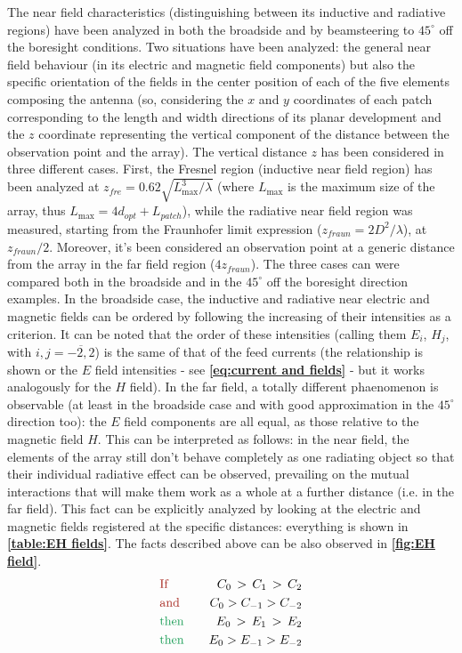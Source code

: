 \documentclass[10 pt,a4paper,twocolumn]{article}
\begin{document}
{The near field characteristics (distinguishing between its inductive and radiative regions) have been analyzed in both the broadside and by beamsteering to $45^\circ$ off the boresight conditions. Two situations have been analyzed: the general near field behaviour (in its electric and magnetic field components) but also the specific orientation of the fields in the center position of each of the five elements composing the antenna (so, considering the $x$ and $y$ coordinates of each patch corresponding to the length and width directions of its planar development and the $z$ coordinate representing the vertical component of the distance between the observation point and the array). The vertical distance $z$ has been considered in three different cases. First, the Fresnel region (inductive near field region) has been analyzed at {\small$z_{fre}=0.62\sqrt{L_{\max}^3/\lambda}$ (where $L_{\max}$} is the maximum size of the array, thus $L_{\max}=4d_{opt}+L_{patch}$), while the radiative near field region was measured, starting from the Fraunhofer limit expression ($z_{fraun}=2D^2/\lambda$), at $z_{fraun}/2$. Moreover, it's been considered an observation point at a generic distance from the array in the far field region ($4z_{fraun}$). The three cases can were compared both in the broadside and in the $45^\circ$ off the boresight direction examples. In the broadside case, the inductive and radiative near electric and magnetic fields can be ordered by following the increasing of their intensities as a criterion. It can be noted that the order of these intensities (calling them $E_i$, $H_j$, with {\small$i,j=\overline{-2,2}$}) is the same of that of the feed currents (the relationship is shown or the $E$ field intensities - see \textbf{\cref{eq:current and fields}} - but it works analogously for the $H$ field). In the far field, a totally different phaenomenon is observable (at least in the broadside case and with good approximation in the $45^\circ$ direction too): the $E$ field components are all equal, as those relative to the magnetic field $H$. This can be interpreted as follows: in the near field, the elements of the array still don't behave completely as one radiating object so that their individual radiative effect can be observed, prevailing on the mutual interactions that will make them work as a whole at a further distance (i.e. in the far field). This fact can be explicitly analyzed by looking at the electric and magnetic fields registered at the specific distances: everything is shown in \textbf{\cref{table:EH fields}}. The facts described above can be also observed in \textbf{\cref{fig:EH field}}.
\begin{equation}
	\begin{aligned}
	&\text{\color{Mahogany}If}\quad &C_0\,>\,C_{1}\,>\,C_2\\
	&\text{\color{Mahogany}and} \quad &C_0>C_{-1}>C_{-2}\\
	&\text{\color{ForestGreen}then} \quad &E_0\,>\,E_{1}\,>\,E_2\\
	&\text{\color{ForestGreen}then} \quad  &E_0>E_{-1}>E_{-2}\\
	\end{aligned}
\label{eq:current and fields}
\end{equation}
}
\end{document}
